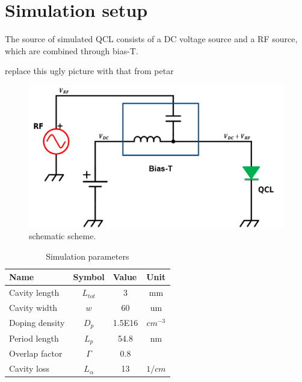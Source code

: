 \documentclass[11pt,final]{scrbook}
\begin{document}
\section{Simulation setup}
The source of simulated QCL consists of a DC voltage source and a RF source, which are combined through bias-T. 

replace this ugly picture with that from petar
\begin{figure}[htbp]
\begin{center}
\includegraphics[scale=0.4]{images/schematicSETUP}
\caption{schematic scheme.}
\label{fig:schematicSETUP}
\end{center}
\end{figure}



\begin{table}[]
\centering
\caption{Simulation parameters}
\label{SIMparameter}
\begin{tabular}{llll}
\hline
\multicolumn{1}{|l|}{\textbf{Name}}  & \multicolumn{1}{l|}{\textbf{Symbol}} & \multicolumn{1}{l|}{\textbf{Value}} & \multicolumn{1}{l|}{\textbf{Unit}}         \\ \hline
\multicolumn{1}{|l|}{Cavity length}  & \multicolumn{1}{c|}{$L_{tot}$}       & \multicolumn{1}{c|}{3}              & \multicolumn{1}{c|}{mm}                    \\ %
\multicolumn{1}{|l|}{Cavity width}  & \multicolumn{1}{c|}{$w$}   & \multicolumn{1}{c|}{60}              & \multicolumn{1}{c|}{um}                    \\ %
\multicolumn{1}{|l|}{Doping density} & \multicolumn{1}{c|}{$D_{p}$ }        & \multicolumn{1}{c|}{1.5E16}         & \multicolumn{1}{c|}{$cm^{-3}$} 			   \\ %
\multicolumn{1}{|l|}{Period length}  & \multicolumn{1}{c|}{$L_{p}$}         & \multicolumn{1}{c|}{54.8}           & \multicolumn{1}{c|}{nm}                    \\ %
\multicolumn{1}{|l|}{Overlap factor} & \multicolumn{1}{c|}{$\Gamma$}          & \multicolumn{1}{c|}{0.8}          & \multicolumn{1}{c|}{}                      \\ 
 \multicolumn{1}{|l|}{Cavity loss}     &  \multicolumn{1}{c|}{$L_{\alpha}$}    &\multicolumn{1}{c|}{13}				&  \multicolumn{1}{c|}{$1/cm$} 						\\ \hline
\end{tabular}
\end{table}
\end{document}
